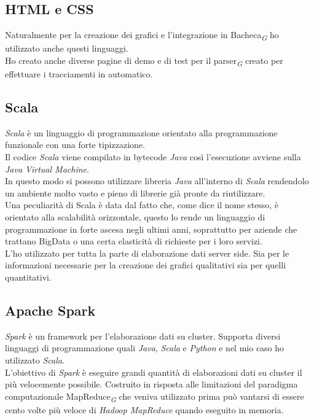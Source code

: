 \documentclass[a4paper, 12pt, twoside, openright]{book}
\newcommand{\gloss}[1]{#1\textsubscript{\textit{\tiny{G}}}}
\begin{document}
\subsection{HTML e CSS}
Naturalmente per la creazione dei grafici e l'integrazione in \gloss{Bacheca} ho utilizzato anche questi linguaggi.\\Ho creato anche diverse pagine di demo e di test per il \gloss{parser} creato per effettuare i tracciamenti in automatico.\\

\subsection{Scala}
\textit{Scala} è un linguaggio di programmazione orientato alla programmazione funzionale con una forte tipizzazione.\\
Il codice \textit{Scala} viene compilato in bytecode \textit{Java} così l'esecuzione avviene sulla \textit{Java Virtual Machine}.\\
In questo modo si possono utilizzare libreria \textit{Java} all'interno di \textit{Scala} rendendolo un ambiente molto vasto e pieno di librerie già pronte da riutilizzare.\\
Una peculiarità di Scala è data dal fatto che, come dice il nome stesso, è orientato alla scalabilità orizzontale, questo lo rende un linguaggio di programmazione in forte ascesa negli ultimi anni, soprattutto per aziende che trattano BigData o una certa elasticità di richieste per i loro servizi.\\

L'ho utilizzato per tutta la parte di elaborazione dati server side. Sia per le informazioni necessarie per la creazione dei grafici qualitativi sia per quelli quantitativi.\\

\subsection{Apache Spark}
\textit{Spark} è un framework per l'elaborazione dati su cluster. Supporta diversi linguaggi di programmazione quali \textit{Java}, \textit{Scala} e \textit{Python} e nel mio caso ho utilizzato \textit{Scala}.\\
L'obiettivo di \textit{Spark} è eseguire grandi quantità di elaborazioni dati su cluster il più velocemente possibile. Costruito in risposta alle limitazioni del paradigma computazionale \gloss{MapReduce} che veniva utilizzato prima può vantarsi di essere cento volte più veloce di \textit{Hadoop MapReduce} quando eseguito in memoria.\\
\end{document}
